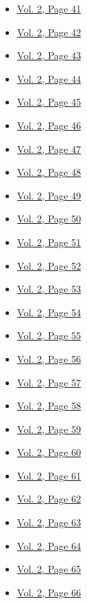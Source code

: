 \begin{itemize}
\begin{itemize}
  \item
    \protect\hyperlink{g-page-253}{Vol. 2, Page 41}
  \item
    \protect\hyperlink{g-page-254}{Vol. 2, Page 42}
  \item
    \protect\hyperlink{g-page-255}{Vol. 2, Page 43}
  \item
    \protect\hyperlink{g-page-256}{Vol. 2, Page 44}
  \item
    \protect\hyperlink{g-page-257}{Vol. 2, Page 45}
  \item
    \protect\hyperlink{g-page-258}{Vol. 2, Page 46}
  \item
    \protect\hyperlink{g-page-259}{Vol. 2, Page 47}
  \item
    \protect\hyperlink{g-page-260}{Vol. 2, Page 48}
  \item
    \protect\hyperlink{g-page-261}{Vol. 2, Page 49}
  \item
    \protect\hyperlink{g-page-262}{Vol. 2, Page 50}
  \item
    \protect\hyperlink{g-page-263}{Vol. 2, Page 51}
  \item
    \protect\hyperlink{g-page-264}{Vol. 2, Page 52}
  \item
    \protect\hyperlink{g-page-265}{Vol. 2, Page 53}
  \item
    \protect\hyperlink{g-page-266}{Vol. 2, Page 54}
  \item
    \protect\hyperlink{g-page-267}{Vol. 2, Page 55}
  \item
    \protect\hyperlink{g-page-268}{Vol. 2, Page 56}
  \item
    \protect\hyperlink{g-page-269}{Vol. 2, Page 57}
  \item
    \protect\hyperlink{g-page-270}{Vol. 2, Page 58}
  \item
    \protect\hyperlink{g-page-271}{Vol. 2, Page 59}
  \item
    \protect\hyperlink{g-page-272}{Vol. 2, Page 60}
  \item
    \protect\hyperlink{g-page-273}{Vol. 2, Page 61}
  \item
    \protect\hyperlink{g-page-274}{Vol. 2, Page 62}
  \item
    \protect\hyperlink{g-page-275}{Vol. 2, Page 63}
  \item
    \protect\hyperlink{g-page-276}{Vol. 2, Page 64}
  \item
    \protect\hyperlink{g-page-277}{Vol. 2, Page 65}
  \item
    \protect\hyperlink{g-page-278}{Vol. 2, Page 66}

\end{itemize}
\end{itemize}
